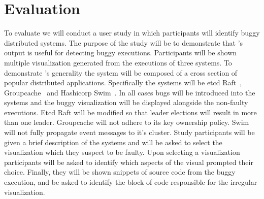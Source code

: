 \section{Evaluation}
\label{sec:evaluation}

To evaluate \dviz we will conduct a user study in which participants
will identify buggy distributed systems. The purpose of the study will
be to demonstrate that \dviz's output is useful for detecting buggy
executions.  Participants will be shown multiple visualization
generated from the executions of three systems. To demonstrate \dviz's
generality the system will be composed of a cross section of popular
distributed applications. Specifically the systems will be etcd
Raft~\cite{etcdraft}, Groupcache~\cite{groupcache} and Hashicorp
Swim~\cite{das2002swim}.  In all cases bugs will be introduced into
the systems and the buggy visualization will be displayed alongside
the non-faulty executions. Etcd Raft will be modified so that leader
elections will result in more than one leader.  Groupcache will not
adhere to its key ownership policy.  Swim will not fully propagate
event messages to it's cluster. Study participants will be given a
brief description of the systems and will be asked to select the
visualization which they suspect to be faulty. Upon selecting a
visualization participants will be asked to identify which aspects of
the visual prompted their choice.  Finally, they will be shown
snippets of source code from the buggy execution, and be asked to
identify the block of code responsible for the irregular
visualization.

